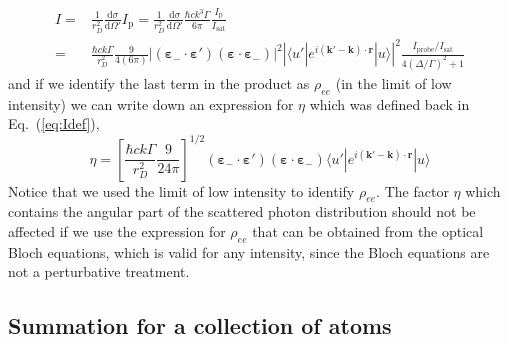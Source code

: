 \documentclass[11pt,letter]{article}
\newcommand{\bv}[1]{\ensuremath{\bm{#1}}}
\begin{document}
\begin{equation}
\begin{split}
I  =& \frac{1}{r_{D}^{2}} \frac{ \mathrm{d} \sigma } { \mathrm{d} \Omega'}
      I_{\mathrm{p}} 
   =   \frac{1}{r_{D}^{2}} \frac{ \mathrm{d} \sigma } { \mathrm{d} \Omega'}
      \frac{\hbar c k^{3}\Gamma}{6 \pi} \frac{I_{\mathrm{p}}}{I_{\mathrm{sat}}}  \\ 
   =& \frac{\hbar c k \Gamma}{r_{D}^{2}}  
    \frac{9}{4 (6\pi)} 
        |(\bv{\varepsilon}_{-}\cdot \bv{\varepsilon}' )
                       (\bv{\varepsilon}\cdot \bv{\varepsilon}_{-} ) |^{2}
    \left|
      \langle u' | e^{i(\bv{k}'-\bv{k}) \cdot\bv{r}} | u  \rangle
  \right| ^{2}
     \frac{ I_{\mathrm{probe}} / I_{\mathrm{sat}}}
        { 4(\Delta/\Gamma)^{2} + 1 }
\end{split}
\end{equation}
and if we identify the last term in the product as $\rho_{ee}$ (in the limit of low intensity) we can write down an expression for $\eta$ which was defined back in Eq.~(\ref{eq:Idef}), 
\begin{equation}
  \eta = \left[ \frac{\hbar c k \Gamma}{r_{D}^{2}}  
    \frac{9}{24\pi} \right]^{1/2} 
        (\bv{\varepsilon}_{-}\cdot \bv{\varepsilon}' )
                       (\bv{\varepsilon}\cdot \bv{\varepsilon}_{-} ) 
      \langle u' | e^{i(\bv{k}'-\bv{k}) \cdot\bv{r}} | u  \rangle
\end{equation}
Notice that we used the limit of low intensity to identify $\rho_{ee}$.  The factor $\eta$ which contains the angular part of the scattered photon distribution should not be affected if we use the expression for $\rho_{ee}$ that can be obtained from the optical Bloch equations, which is valid for any intensity, since the Bloch equations are not a perturbative treatment. 

\subsection{Summation for a collection of atoms} 
\end{document}
